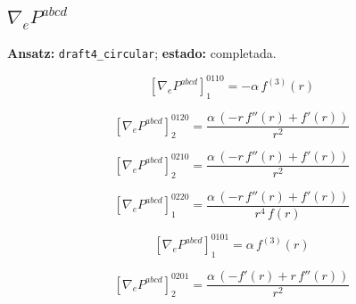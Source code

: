 \documentclass[11pt]{article}
\begin{document}
\subsection*{$ \nabla_e P^{abcd} $}
\textbf{Ansatz:} \texttt{draft4\_circular}; \textbf{estado:} completada.\par
\begin{dmath*}[breakdepth={5}]
\left[\nabla_e P^{abcd}\right]_{1}^{0110} = -\alpha\,f^{(3)}\!\left(r\right)
\end{dmath*}
\par\smallskip
\begin{dmath*}[breakdepth={5}]
\left[\nabla_e P^{abcd}\right]_{2}^{0120} = \frac{\alpha\,\left(-r\,f''\!\left(r\right) + f'\!\left(r\right)\right)}{{r}^{2}}
\end{dmath*}
\par\smallskip
\begin{dmath*}[breakdepth={5}]
\left[\nabla_e P^{abcd}\right]_{2}^{0210} = \frac{\alpha\,\left(-r\,f''\!\left(r\right) + f'\!\left(r\right)\right)}{{r}^{2}}
\end{dmath*}
\par\smallskip
\begin{dmath*}[breakdepth={5}]
\left[\nabla_e P^{abcd}\right]_{1}^{0220} = \frac{\alpha\,\left(-r\,f''\!\left(r\right) + f'\!\left(r\right)\right)}{{r}^{4}\,f\!\left(r\right)}
\end{dmath*}
\par\smallskip
\begin{dmath*}[breakdepth={5}]
\left[\nabla_e P^{abcd}\right]_{1}^{0101} = \alpha\,f^{(3)}\!\left(r\right)
\end{dmath*}
\par\smallskip
\begin{dmath*}[breakdepth={5}]
\left[\nabla_e P^{abcd}\right]_{2}^{0201} = \frac{\alpha\,\left(-f'\!\left(r\right) + r\,f''\!\left(r\right)\right)}{{r}^{2}}
\end{dmath*}
\end{document}
